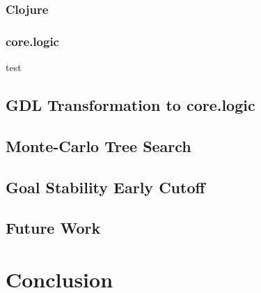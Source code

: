 \documentclass[letterpaper]{article}
\begin{document}
\subsubsection{Clojure}

\subsubsection{core.logic}

test \cite{byrd2010relational}

\subsection{GDL Transformation to core.logic}

\subsection{Monte-Carlo Tree Search}

\subsection{Goal Stability Early Cutoff}

\subsection{Future Work}

\section{Conclusion}



\end{document}
